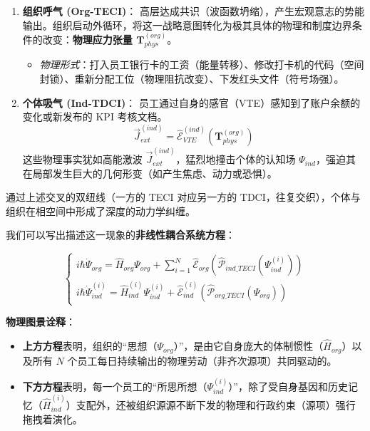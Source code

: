 \begin{enumerate}
    \item \textbf{组织呼气 (Org-TECI)}：
    高层达成共识（波函数坍缩），产生宏观意志的势能输出。组织启动外循环，将这一战略意图转化为极其具体的物理和制度边界条件的改变：\textbf{物理应力张量 $\mathbf{T}_{phys}^{(org)}$}。
    \begin{itemize}
        \item \textit{物理形式}：打入员工银行卡的工资（能量转移）、修改打卡机的代码（空间封锁）、重新分配工位（物理阻抗改变）、下发红头文件（符号场强）。
    \end{itemize}

    \item \textbf{个体吸气 (Ind-TDCI)}：
    员工通过自身的感官（VTE）感知到了账户余额的变化或新发布的 KPI 考核文档。
    $$ \vec{J}_{ext}^{(ind)} = \hat{\mathcal{E}}_{VTE}^{(ind)} \left( \mathbf{T}_{phys}^{(org)} \right) $$
    这些物理事实犹如高能激波 $\vec{J}_{ext}^{(ind)}$，猛烈地撞击个体的认知场 $\Psi_{ind}$，强迫其在局部发生巨大的几何形变（如产生焦虑、动力或恐惧）。
\end{enumerate}


通过上述交叉的双纽线（一方的 TECI 对应另一方的 TDCI，往复交织），个体与组织在相空间中形成了深度的动力学纠缠。

我们可以写出描述这一现象的\textbf{非线性耦合系统方程}：

$$ \begin{cases}
i\hbar \dot{\Psi}_{org} = \hat{H}_{org} \Psi_{org} + \sum_{i=1}^N \hat{\mathcal{E}}_{org}\left(\hat{\mathcal{P}}_{ind\_TECI} (\Psi_{ind}^{(i)})\right) \\
i\hbar \dot{\Psi}_{ind}^{(i)} = \hat{H}_{ind}^{(i)} \Psi_{ind}^{(i)} + \hat{\mathcal{E}}_{ind}^{(i)}\left(\hat{\mathcal{P}}_{org\_TECI} (\Psi_{org})\right)
\end{cases} $$

\textbf{物理图景诠释}：
\begin{itemize}
    \item \textbf{上方方程}表明，组织的“思想（$\Psi_{org}$）”，是由它自身庞大的体制惯性（$\hat{H}_{org}$）以及所有 $N$ 个员工每日持续输出的物理劳动（非齐次源项）共同驱动的。
    \item \textbf{下方方程}表明，每一个员工的“所思所想（$\Psi_{ind}^{(i)}$）”，除了受自身基因和历史记忆（$\hat{H}_{ind}^{(i)}$）支配外，还被组织源源不断下发的物理和行政约束（源项）强行拖拽着演化。
\end{itemize}

